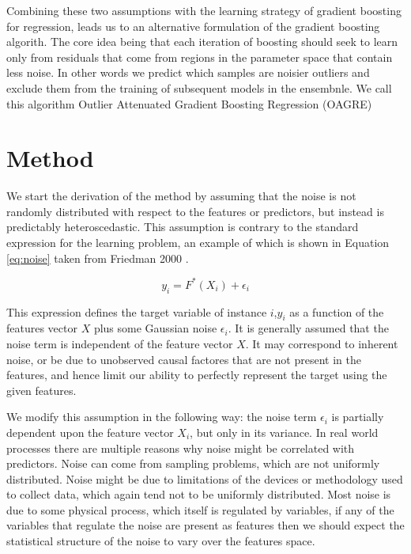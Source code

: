 \documentclass[graybox]{svmult}
\begin{document}
Combining these two assumptions with the learning strategy of gradient boosting for regression, leads us to an
alternative formulation of the gradient boosting algorith. The core idea being that each iteration of boosting should
seek to learn only from residuals that come from regions in the parameter space that contain less noise. In other
words we predict which samples are noisier outliers and exclude them from the training of subsequent models in the
ensembnle. We call this algorithm Outlier Attenuated Gradient Boosting Regression (OAGRE)

\section{Method}

We start the derivation of the method by assuming that the noise is not randomly distributed with respect to the
features or predictors, but instead is predictably heteroscedastic.
This assumption is contrary to the standard expression for the learning problem,
an example of which is shown in Equation \ref{eq:noise} taken from Friedman 2000 \cite{Friedman2000}.

\begin{equation}
y_i = F^*(X_i) + \epsilon_i
\label{eq:noise}
\end{equation}

This expression defines the target variable of instance $i$,$y_i$ as a function of the features vector $X$
plus some Gaussian noise $\epsilon_i$. It is generally assumed that the noise term is independent of the 
feature vector $X$. It may correspond to inherent noise, or be due to unobserved causal factores that are
not present in the features, and hence limit our ability to perfectly represent the target using the given
features.
 
We modify this assumption in the following way: the noise term $\epsilon_i$ is partially dependent upon the
feature vector $X_i$, but only in its variance. In real world processes there are multiple reasons
why noise might be correlated with predictors. Noise can come from sampling problems,
which are not uniformly distributed. Noise might be due to limitations of the devices
or methodology used to collect data, which again tend not to be uniformly distributed.
Most noise is due to some physical process, which itself is regulated by variables,
if any of the variables that regulate the noise are present as features then we should 
expect the statistical structure of the noise to vary over the features space.
\end{document}
